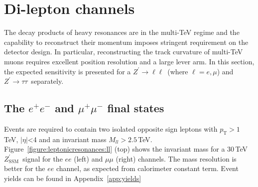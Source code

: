 \documentclass[a4paper,11pt]{article}
\newcommand{\CH}[1] {\textbf{\textcolor{blue}{CH - #1}}}
\newcommand{\Zp}{\ensuremath{Z^{\prime}}}
\newcommand{\ZpSSM}{\ensuremath{Z^{\prime}_{\mathrm{SSM}}}}
\newcommand{\Z}{\ensuremath{Z}}
\newcommand*{\Zptata}{\ensuremath{Z^{\prime}\rightarrow \tau\tau}}
\newcommand*{\Zpll}{\ensuremath{Z^{\prime}\rightarrow \ell\ell}}
\newcommand{\pt}{\ensuremath{p_{\text{T}}}}
\newcommand{\mll}{\ensuremath{M_{\ensuremath{ll}}}}
\newcommand*{\ee}{\ensuremath{e^{+}e^{-}}}
\newcommand*{\mumu}{\ensuremath{\mu^{+}\mu^{-}}}
\begin{document}
\section{Di-lepton channels}
\label{sec:lep}


The decay products of heavy resonances are in the multi-TeV regime and the capability to reconstruct their momentum imposes stringent requirement on the detector design. In particular, reconstructing the track curvature of multi-TeV muons requires excellent position resolution and a large lever arm. In this section, the expected sensitivity is presented for a \Zpll\ (where $\ell=e,\mu$) and \Zptata\ separately.

\subsection{The \texorpdfstring{\ee}{ee} and \texorpdfstring{\mumu}{mumu} final states}
\label{sec:lepee}

Events are required to contain two isolated opposite sign leptons with $\pt > 1$\,TeV, $|\eta|$<4 and an invariant mass $\mll > 2.5$\,TeV.
Figure~\ref{figure:leptonicresonances:ll} (top) shows the invariant mass for a 30\,TeV \ZpSSM\ signal for the $ee$ (left) and $\mu\mu$ (right) channels. The mass resolution is better for the $ee$ channel, as expected from calorimeter constant term. Event yields can be found in Appendix~\ref{app:yields}
\end{document}
